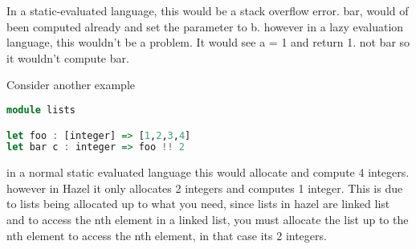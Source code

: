 \documentclass{article}
\begin{document}
In a static-evaluated language, this would be a stack overflow error. bar, would of been computed already and set the parameter to b. however in a lazy evaluation language, this wouldn't be a problem. It would see a = 1 and return 1. not bar so it wouldn't compute bar. 

Consider another example 


\begin{lstlisting}[language=Haskell, caption=consider a function that returns a list and your indexing the list]
module lists

let foo : [integer] => [1,2,3,4]
let bar c : integer => foo !! 2

\end{lstlisting}

in a normal static evaluated language this would allocate and compute 4 integers. however in Hazel it only allocates 2 integers and computes 1 integer. This is due to lists being allocated up to what you need, since lists in hazel are linked list and to access the nth element in a linked list, you must allocate the list up to the nth element to access the nth element, in that case its 2 integers. 
\end{document}
